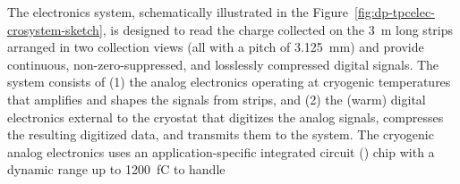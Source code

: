The  electronics system, schematically illustrated in the Figure~\ref{fig:dp-tpcelec-crosystem-sketch}, is designed to read the charge collected on the \SI{3}{m} long  strips arranged in two collection views (all with a pitch of \SI{3.125}{mm}) and 
provide continuous, non-zero-suppressed, and losslessly compressed digital signals.  
The system consists of (1) the  analog electronics operating at cryogenic temperatures that amplifies and shapes the signals from  strips, and (2) the (warm) digital electronics external to the cryostat that digitizes the analog signals, compresses the resulting digitized data, and transmits them to the  system.  The cryogenic  analog electronics uses an application-specific integrated circuit () chip with a dynamic range up to \SI{1200}{fC} to handle %
